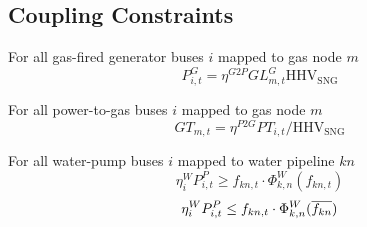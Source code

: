 \subsection{Coupling Constraints}

For all gas-fired generator buses $i$ mapped to gas node $m$ \atallt{}
\begin{equation}
  P^G_{i,t} = \eta^{G2P} GL^G_{m,t} \text{HHV}_{\text{SNG}}
\end{equation}

For all power-to-gas buses $i$ mapped to gas node $m$ \atallt{}
\begin{equation}
  GT_{m,t} =  \eta^{P2G} PT_{i,t} /\text{HHV}_\text{SNG}
\end{equation}

For all water-pump buses $i$ mapped to water pipeline $kn$ \atallt{}
\begin{equation}
  \eta^W_i P^P_{i,t} \geq f_{kn,t} \cdot \Phi^W_{k,n}(f_{kn,t})
\end{equation}
\begin{equation}
  \eta^W_i P^P_{i,t} \leq f_{kn,t} \cdot \Phi^W_{k,n}(\overline{f_{kn}})
\end{equation}
